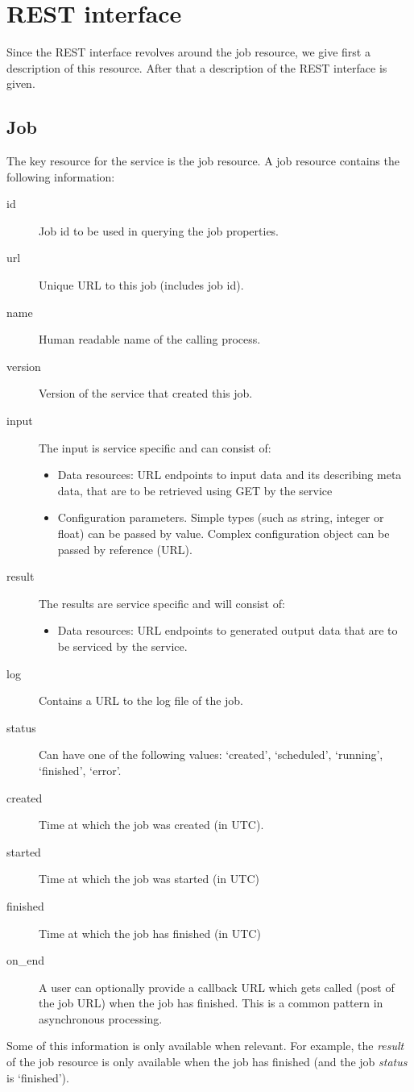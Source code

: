 \documentclass[a4paper]{article}
\begin{document}
\section{REST interface}
Since the REST interface revolves around the job resource, we give first a description of this resource. After that a description of the REST interface is
given. 

\subsection{Job}

The key resource for the service is the job resource. A job resource contains
the following information:
\begin{description}
  \item[id] Job id to be used in querying the job properties.
  \item[url] Unique URL to this job (includes job id).
  \item[name] Human readable name of the calling process.
  \item[version] Version of the service that created this job.
  \item[input] The input is service specific and can consist of:
    \begin{itemize}
      \item Data resources: URL endpoints to input data and its describing meta data, that are to be
      retrieved using GET by the service
      \item Configuration parameters. Simple types (such as string, integer or
      float) can be passed by value. Complex configuration object can be passed
      by reference (URL). 
    \end{itemize}
  \item[result] The results are service specific and will consist of:
    \begin{itemize}
      \item Data resources: URL endpoints to generated output data that are to
      be serviced by the service.
    \end{itemize}
  \item[log] Contains a URL to the log file of the job. 
  \item[status] Can have one of the following values: `created', `scheduled',
  `running', `finished', `error'.
  \item[created] Time at which the job was created (in UTC).
  \item[started] Time at which the job was started (in UTC)
  \item[finished] Time at which the job has finished (in UTC)
  \item[on\_end] A user can optionally provide a callback URL which gets called
  (post of the job URL) when the job has finished. This is a common pattern in asynchronous processing.
\end{description}
Some of this information is only available when relevant. For example, the
\emph{result} of the job resource is only available when the job has finished
(and the job \emph{status} is `finished'). 
\end{document}

